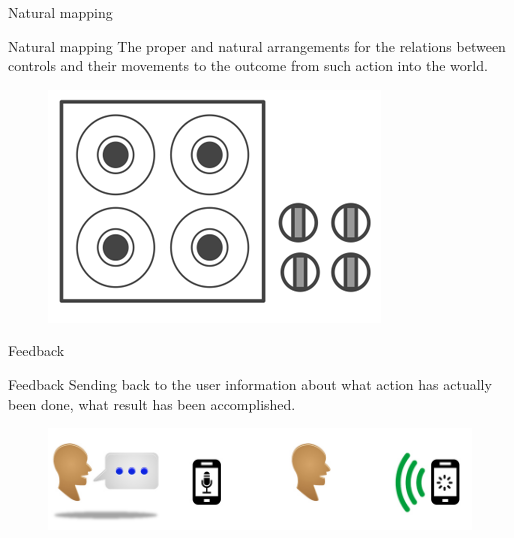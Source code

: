 \documentclass{beamer}
\begin{document}
\begin{frame}{Natural mapping}
	\begin{block}{Natural mapping}
	The proper and natural arrangements for the relations between controls and their 	movements to the outcome from such action into the world.
	\end{block}
	\begin{figure}[ht]
	\includegraphics[scale=0.3]{stove_natural.png}
	\end{figure}
	\end{frame}

\begin{frame}{Feedback}
	\begin{block}{Feedback}
	Sending back to the user information about what action has actually been done, what result has been accomplished.
	\end{block}
	\begin{figure}[ht]
	\includegraphics[scale=0.3]{retro-action-speaking.jpg}
	\end{figure}
\end{frame}
\end{document}
